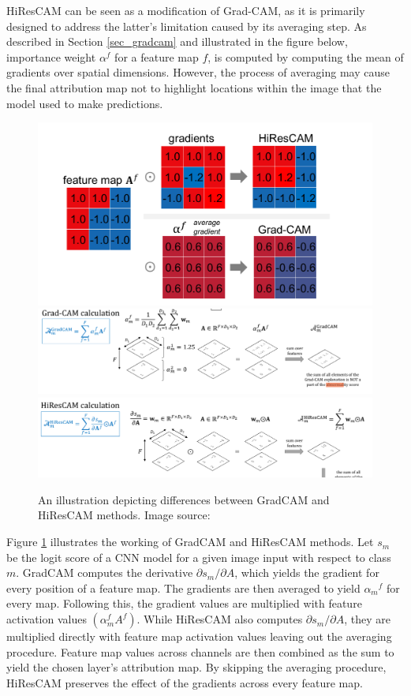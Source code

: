 \documentclass[../report.tex]{subfiles}
\begin{document}
	HiResCAM can be seen as a modification of Grad-CAM, as it is primarily designed to address the latter’s limitation caused by its averaging step. As described in Section \ref{sec_gradcam} and illustrated in the figure below, importance weight $\alpha^f$ for a feature map $f$, is computed by computing the mean of gradients over spatial dimensions. However, the process of averaging may cause the final attribution map not to highlight locations within the image that the model used to make predictions.
	
	\begin{figure}[H]
		\centering
		\includegraphics[scale=0.3]{images/chapter3/hi_res_1.png}
		\includegraphics[scale=0.3]{images/chapter3/hi_res_2.png}
		\includegraphics[scale=0.3]{images/chapter3/hi_res_3.png}
		\caption[An illustration depicting differences between GradCAM and HiResCAM methods]{An illustration depicting differences between GradCAM and HiResCAM methods. Image source: \cite{draelos2020hirescam}}
		\label{fig_hires_op}
	\end{figure}
	Figure \ref{fig_hires_op} illustrates the working of GradCAM and HiResCAM methods. Let $s_m$ be the logit score of a CNN model for a given image input with respect to class $m$. GradCAM computes the derivative $\partial s_m / \partial A$, which yields the gradient for every position of a feature map. The gradients are then averaged to yield ${\alpha_m}^f$ for every map. Following this, the gradient values are multiplied with feature activation values $(\alpha_m^f A^f)$. While HiResCAM also computes  $\partial s_m / \partial A$, they are multiplied directly with feature map activation values leaving out the averaging procedure. Feature map values across channels are then combined as the sum to yield the chosen layer’s attribution map. By skipping the averaging procedure, HiResCAM preserves the effect of the gradients across every feature map.
	
\end{document}
